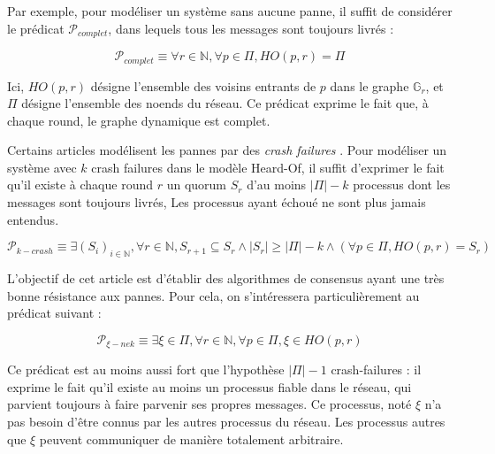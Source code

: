 \documentclass{article}
\begin{document}



Par exemple, pour modéliser un système sans aucune panne, il suffit de considérer le prédicat $\mathcal{P}_{complet}$, dans lequels tous les messages sont toujours livrés :

$$\mathcal{P}_{complet} \equiv \forall r \in \mathds{N}, \forall p \in \Pi, HO(p, r) = \Pi$$

Ici, $HO(p, r)$ désigne l'ensemble des voisins entrants de $p$ dans le graphe $\mathds{G}_r$, et $\Pi$ désigne l'ensemble des noends du réseau.
Ce prédicat exprime le fait que, à chaque round, le graphe dynamique est complet.

Certains articles modélisent les pannes par des \emph{crash failures} \cite{dds}.
Pour modéliser un système avec $k$ crash failures dans le modèle Heard-Of,
il suffit d'exprimer le fait qu'il existe à chaque round $r$ un quorum $S_r$ d'au moins $|\Pi| - k$ processus dont les messages sont toujours livrés,
Les processus ayant échoué ne sont plus jamais entendus.

$$\mathcal{P}_{k-crash} \equiv \exists (S_i)_{i \in \mathds{N}}, \forall r \in \mathds{N}, S_{r+1} \subseteq S_r \wedge |S_r| \geq |\Pi| - k \wedge (\forall p \in \Pi, HO(p, r) = S_r)$$

L'objectif de cet article est d'établir des algorithmes de consensus ayant une très bonne résistance aux pannes. Pour cela, on s'intéressera particulièrement au prédicat suivant :

$$\mathcal{P}_{\xi-nek} \equiv \exists \xi \in \Pi, \forall r \in \mathds{N}, \forall p \in \Pi, \xi \in HO(p,r)$$

Ce prédicat est au moins aussi fort que l'hypothèse $|\Pi| - 1$ crash-failures :
il exprime le fait qu'il existe au moins un processus fiable dans le réseau, qui parvient toujours à faire parvenir ses propres messages.
Ce processus, noté $\xi$ n'a pas besoin d'être connus par les autres processus du réseau.
Les processus autres que $\xi$ peuvent communiquer de manière totalement arbitraire.
\end{document}

